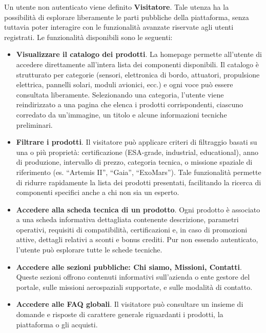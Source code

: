 \documentclass[a4paper,12pt]{report}
\begin{document}
Un utente non autenticato viene definito \textbf{Visitatore}. Tale utenza
ha la possibilità di esplorare liberamente le parti pubbliche della piattaforma,
senza tuttavia poter interagire con le funzionalità avanzate riservate agli utenti registrati.
Le funzionalità disponibili sono le seguenti:

\begin{itemize}
    \item \textbf{Visualizzare il catalogo dei prodotti}.  
    La homepage permette all’utente di accedere direttamente all’intera lista
    dei componenti disponibili. Il catalogo è strutturato per categorie
    (sensori, elettronica di bordo, attuatori, propulsione elettrica,
    pannelli solari, moduli avionici, ecc.) e ogni voce può essere consultata
    liberamente.  
    Selezionando una categoria, l’utente viene reindirizzato a una pagina che
    elenca i prodotti corrispondenti, ciascuno corredato da un’immagine,
    un titolo e alcune informazioni tecniche preliminari.

    \item \textbf{Filtrare i prodotti}.  
    Il visitatore può applicare criteri di filtraggio basati su una o più proprietà:
    certificazione (ESA-grade, industrial, educational), anno di produzione,
    intervallo di prezzo, categoria tecnica, o missione spaziale di riferimento
    (es. “Artemis II”, “Gaia”, “ExoMars”).  
    Tale funzionalità permette di ridurre rapidamente la lista dei prodotti
    presentati, facilitando la ricerca di componenti specifici anche a chi
    non sia un esperto.

    \item \textbf{Accedere alla scheda tecnica di un prodotto}.  
    Ogni prodotto è associato a una scheda informativa dettagliata
    contenente descrizione, parametri operativi, requisiti di compatibilità,
    certificazioni e, in caso di promozioni attive, dettagli relativi a sconti
    e bonus crediti.  
    Pur non essendo autenticato, l’utente può esplorare tutte le schede tecniche.

    \item \textbf{Accedere alle sezioni pubbliche: Chi siamo, Missioni, Contatti}.  
    Queste sezioni offrono contenuti informativi sull’azienda o ente gestore
    del portale, sulle missioni aerospaziali supportate, e sulle modalità
    di contatto.

    \item \textbf{Accedere alle FAQ globali}.  
    Il visitatore può consultare un insieme di domande e risposte di carattere
    generale riguardanti i prodotti, la piattaforma o gli acquisti.


\end{itemize}
\end{document}
